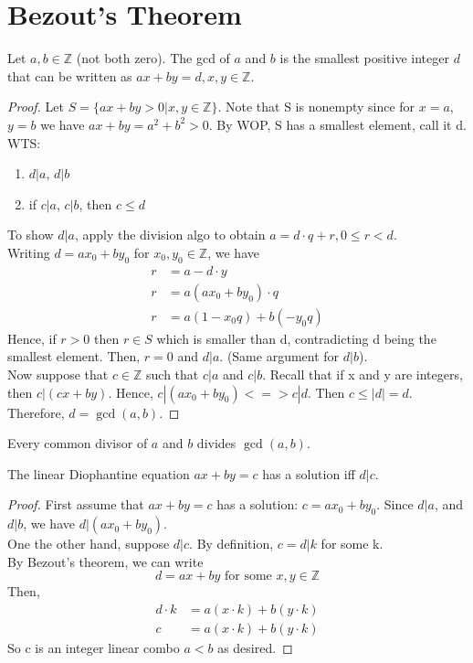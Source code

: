 \section{Bezout's Theorem}
    Let $a,b\in\mathbb{Z}$ (not both zero). The gcd of $a$ and $b$ is the smallest
    positive integer $d$ that can be written as $ax+by=d, x,y\in\mathbb{Z}$.
    \begin{proof}
        Let $S = \{ax+by>0 | x,y\in\mathbb{Z}\}$. 
        Note that S is nonempty since for $x=a$, $y=b$ we have $ax+by= a^2+b^2>0$.
        By WOP, S has a smallest element, call it d. WTS:
        \begin{enumerate}
            \item $d|a$, $d|b$
            \item if $c|a$, $c|b$, then $c\leq d$
        \end{enumerate}
        To show $d|a$, apply the division algo to obtain $a=d\cdot q + r, 0\leq r<d$. \\
        Writing $d=ax_0 + by_0$ for $x_0,y_0\in\mathbb{Z}$, we have
        \begin{align*}
            r & = a-d\cdot y \\
            r & = a(ax_0 + by_0)\cdot q \\
            r & = a(1-x_0q) + b(-y_0q)
        \end{align*}
        Hence, if $r>0$ then $r\in S$ which is smaller than d, contradicting d being
        the smallest element. Then, $r=0$ and $d|a$. (Same argument for $d|b$). \\
        Now suppose that $c\in\mathbb{Z}$ such that $c|a$ and $c|b$. Recall that if x and y
        are integers, then $c|(cx+by)$. Hence, $c|(ax_0+by_0) <=> c|d$. 
        Then $c\leq |d| = d$.
        Therefore, $d=\gcd(a,b)$.
    \end{proof}
    \begin{corollary}
        Every common divisor of $a$ and $b$ divides $\gcd(a,b)$.
    \end{corollary}
    \begin{corollary}
        The linear Diophantine equation $ax+by=c$ has a solution iff $d|c$.
    \end{corollary}
    \begin{proof}
        First assume that $ax+by=c$ has a solution: $c=ax_0+by_0$. 
        Since $d|a$, and $d|b$, we have $d|(ax_0+by_0)$. \\
        One the other hand, suppose $d|c$. By definition, $c=d|k$ for some k. \\
        By Bezout's theorem, we can write 
        \[
            d=ax+by \text{ for some } x,y\in\mathbb{Z}
        \]
        Then,
        \begin{align*}
            d\cdot k & = a(x\cdot k) + b(y \cdot k) \\
            c & = a(x\cdot k)+b(y\cdot k)
        \end{align*}
        So c is an integer linear combo $a < b$ as desired.
    \end{proof}

